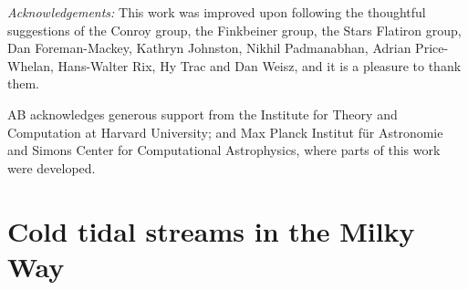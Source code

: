 \documentclass[modern]{aastex61}
\begin{document}

\emph{Acknowledgements:} This work was improved upon following the thoughtful suggestions of the Conroy group, the Finkbeiner group, the Stars Flatiron group, Dan Foreman-Mackey, Kathryn Johnston, Nikhil Padmanabhan, Adrian Price-Whelan, Hans-Walter Rix, Hy Trac and Dan Weisz, and it is a pleasure to thank them.

AB acknowledges generous support from the Institute for Theory and Computation at Harvard University; and Max Planck Institut f\"ur Astronomie and Simons Center for Computational Astrophysics, where parts of this work were developed.




\appendix
\section{Cold tidal streams in the Milky Way}
\label{sec:streams}
\end{document}
